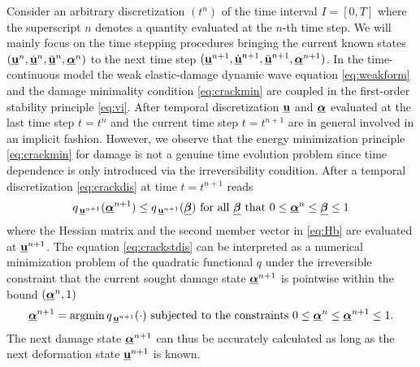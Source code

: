 Consider an arbitrary discretization $(t^n)$ of the time interval $I=[0,T]$ where the superscript $n$ denotes a quantity evaluated at the $n$-th time step. We will mainly focus on the time stepping procedures bringing the current known states $(\uvec^n,\dot{\uvec}^n,\ddot{\uvec}^n,\dvec^n)$ to the next time step $(\uvec^{n+1},\dot{\uvec}^{n+1},\ddot{\uvec}^{n+1},\dvec^{n+1})$. In the time-continuous model the weak elastic-damage dynamic wave equation \eqref{eq:weakform} and the damage minimality condition \eqref{eq:crackmin} are coupled in the first-order stability principle \eqref{eq:vi}. After temporal discretization $\uvec$ and $\dvec$ evaluated at the last time step $t=t^n$ and the current time step $t=t^{n+1}$ are in general involved in an implicit fashion. However, we observe that the energy minimization principle \eqref{eq:crackmin} for damage is not a genuine time evolution problem since time dependence is only introduced via the irreversibility condition. After a temporal discretization \eqref{eq:crackdis} at time $t=t^{n+1}$ reads
\begin{equation} \label{eq:crackstdis}
q_{\,\uvec^{n+1}}(\dvec^{n+1})\leq q_{\,\uvec^{n+1}}(\underline{\vec{\beta}}) \text{ for all $\underline{\vec{\beta}}$ that $0\leq\dvec^n\leq\underline{\vec{\beta}}\leq 1$}
\end{equation}
where the Hessian matrix and the second member vector in \eqref{eq:Hb} are evaluated at $\uvec^{n+1}$. The equation \eqref{eq:crackstdis} can be interpreted as a numerical minimization problem of the quadratic functional $q$ under the irreversible constraint that the current sought damage state $\dvec^{n+1}$ is pointwise within the bound $(\dvec^n,1)$
\begin{equation} \label{eq:cracknummin}
\dvec^{n+1}=\operatorname{arg min}q_{\,\uvec^{n+1}}(\cdot)\text{ subjected to the constraints $0\leq\dvec^n\leq\dvec^{n+1}\leq 1$}.
\end{equation}
The next damage state $\dvec^{n+1}$ can thus be accurately calculated as long as the next deformation state $\uvec^{n+1}$ is known.


